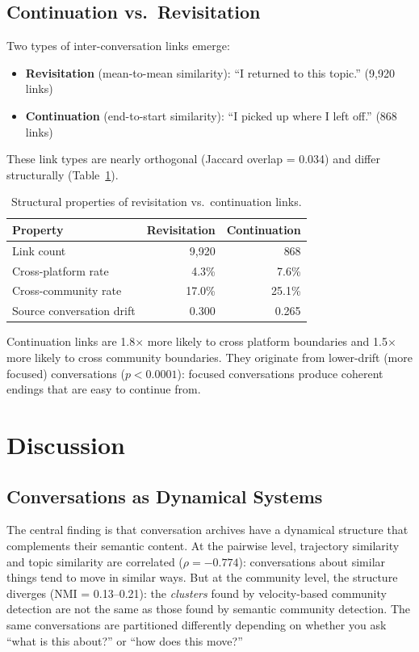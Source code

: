 \documentclass[11pt]{article}
\begin{document}
\subsection{Continuation vs.\ Revisitation}

Two types of inter-conversation links emerge:

\begin{itemize}
\item \textbf{Revisitation} (mean-to-mean similarity): ``I returned to this topic.'' (9,920 links)
\item \textbf{Continuation} (end-to-start similarity): ``I picked up where I left off.'' (868 links)
\end{itemize}

These link types are nearly orthogonal (Jaccard overlap = 0.034) and differ structurally (Table~\ref{tab:links}).

\begin{table}[h]
\centering
\caption{Structural properties of revisitation vs.\ continuation links.}
\label{tab:links}
\begin{tabular}{lrr}
\toprule
Property & Revisitation & Continuation \\
\midrule
Link count & 9,920 & 868 \\
Cross-platform rate & 4.3\% & 7.6\% \\
Cross-community rate & 17.0\% & 25.1\% \\
Source conversation drift & 0.300 & 0.265 \\
\bottomrule
\end{tabular}
\end{table}

Continuation links are 1.8$\times$ more likely to cross platform boundaries and 1.5$\times$ more likely to cross community boundaries. They originate from lower-drift (more focused) conversations ($p < 0.0001$): focused conversations produce coherent endings that are easy to continue from.

\section{Discussion}

\subsection{Conversations as Dynamical Systems}

The central finding is that conversation archives have a dynamical structure that complements their semantic content. At the pairwise level, trajectory similarity and topic similarity are correlated ($\rho = -0.774$): conversations about similar things tend to move in similar ways. But at the community level, the structure diverges (NMI = 0.13--0.21): the \emph{clusters} found by velocity-based community detection are not the same as those found by semantic community detection. The same conversations are partitioned differently depending on whether you ask ``what is this about?'' or ``how does this move?''
\end{document}

